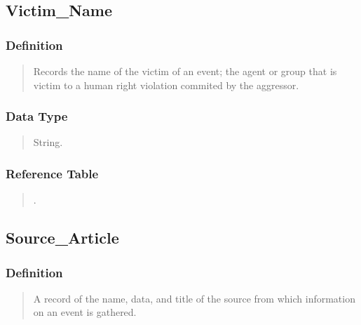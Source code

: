 \documentclass[letterpaper,10pt,english]{sphinxmanual}
\begin{document}
\subsection{Victim\_Name}
\label{\detokenize{database_schema:victim-name}}

\subsubsection{Definition}
\label{\detokenize{database_schema:id11}}\begin{quote}

\sphinxAtStartPar
Records the name of the victim of an event; the agent or group that is victim to a human right violation commited by the aggressor.
\end{quote}


\subsubsection{Data Type}
\label{\detokenize{database_schema:id12}}\begin{quote}

\sphinxAtStartPar
String.
\end{quote}


\subsubsection{Reference Table}
\label{\detokenize{database_schema:id13}}\begin{quote}

\sphinxAtStartPar
{\hyperref[\detokenize{database_schema:victim-table}]{}}.
\end{quote}


\subsection{Source\_Article}
\label{\detokenize{database_schema:source-article}}

\subsubsection{Definition}
\label{\detokenize{database_schema:id14}}\begin{quote}

\sphinxAtStartPar
A record of the name, data, and title of the source from which information on an event is gathered.
\end{quote}
\end{document}
